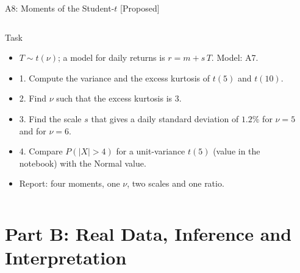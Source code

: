 \begin{frame}{A8: Moments of the Student-$t$ [Proposed]}
\propsub
\itemsize{\scriptsize}
\begin{columns}[T]
\begin{column}{\taskw}
\begin{block}{Task}
\begin{itemize}
    \item $T \sim t(\nu)$; a model for daily returns is $r = m + s\,T$. Model: A7.
    \item 1. Compute the variance and the excess kurtosis of $t(5)$ and $t(10)$.
    \item 2. Find $\nu$ such that the excess kurtosis is 3.
    \item 3. Find the scale $s$ that gives a daily standard deviation of $1.2\%$ for $\nu = 5$ and for $\nu = 6$.
    \item 4. Compare $P(|X| > 4)$ for a unit-variance $t(5)$ (value in the notebook) with the Normal value.
    \item Report: four moments, one $\nu$, two scales and one ratio.
\end{itemize}
\end{block}
\end{column}
\begin{column}{\solw}
\end{column}
\end{columns}
\end{frame}


\section{Part B: Real Data, Inference and Interpretation}

